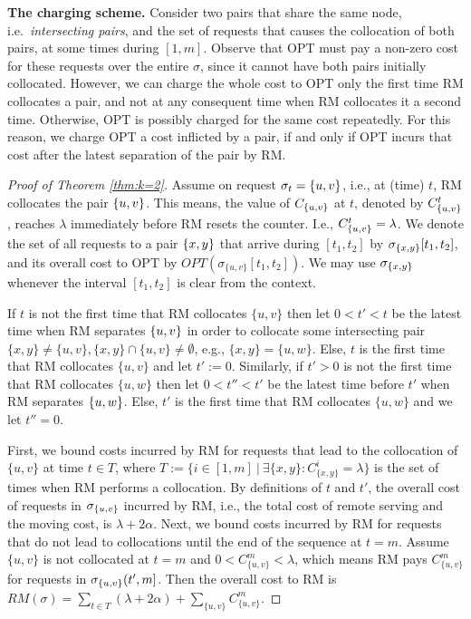 \documentclass[a4paper,anonymous,USenglish]{lipics-v2019}
\newcommand{\OPT}{\textsc{OPT}\xspace}
\newcommand{\RM}{\textsc{RM}\xspace} %
\DeclarePairedDelimiter\set{\{}{\}}
\begin{document}
\textbf{The charging scheme.}
Consider two  pairs that share the same node, 
i.e.~\emph{intersecting pairs},
and the set of requests that causes the collocation of both pairs,
at some  times during  $[1,m]$.
Observe that \OPT must pay a non-zero cost
for these requests over the entire $\sigma$,
since it cannot have both pairs initially collocated.
However,
we can charge the whole cost to \OPT only the first time \RM collocates a pair,
and not at any consequent time when \RM collocates it a second time.
Otherwise,
 \OPT is possibly charged for the same cost repeatedly.
For this reason,
we charge \OPT a cost inflicted by a pair,
if and only if  \OPT incurs that cost after the latest separation of the pair by \RM.

\begin{proof}[Proof of Theorem \ref{thm:k=2}]
	Assume on request $\sigma_{t}=\set{u,v}$, 
	i.e., at (time) $t$,
	\RM collocates the pair $\set{u,v}$.
	This means,
	the value of $C_{\set{u,v}}$ at $t$,
	denoted by $C^t_{\set{u,v}}$, 
	reaches $\lambda$ immediately before \RM resets the counter.
	I.e.,
	$ C^t_{\set{u,v}} = \lambda$.
	We denote the set of all requests to a pair $\set{x,y}$ that arrive
	during $[t_1,t_2]$ by $\sigma_{\set{x,y}}[t_1,t_2]$,
	and its overall cost to \OPT by
	$\mathit{OPT} (\sigma_{\{u,v\}}[t_1,t_2])$.
	We may use $\sigma_{\set{x,y}}$ whenever
	 the interval $[t_1,t_2]$ is clear from the context.
	
	If $t$ is not the first time that \RM collocates $\{u,v\}$ then
	let $0 < t' < t$ be the latest time when \RM separates $\set{u,v}$
	in order to collocate some intersecting pair
	$\{x,y\} \neq \{u,v\}, \{x,y\} \cap \{u,v\} \neq \emptyset$, 
	e.g.,
	$\{x,y\}=\{u,w\}$.
	Else,
	$t$ is the first time that \RM collocates $\{u,v\}$ and let $t' := 0$.
	Similarly,
	if $t' > 0$ is not the first time that \RM  collocates $\{u,w\}$ 
	then let $0 < t'' < t'$ be the latest time before $t'$ when \RM separates $\set{u,w}$.
	Else,
	$t'$ is the first time that \RM collocates $\{u,w\}$ and we let $t''=0$.
	
	First,
	we bound  costs incurred by \RM for requests that
	lead to the collocation of $\{u,v\}$ at time $t \in T$, where
	$T := \{ i \in [1,m] ~\vert~ \exists \{x,y\}: C^{i}_{\{x,y\}} = \lambda \}$
	is the set of times when \RM performs a collocation.
	By definitions of $t$ and $t'$,
	the overall cost of requests in $\sigma_{\set{u,v}}$ incurred by \RM,
	i.e., the total cost of remote serving
	and the moving cost, is
	$\lambda + 2\alpha$.	
	Next,
	we bound costs incurred by \RM
	for requests that do not lead to collocations until the  end of the sequence at $t=m$.
	Assume $\{u,v\}$ is not collocated at $t=m$
	and $0 < C^{m}_{ \{u,v\} } < \lambda $,
	which means \RM pays $C^{m}_{ \{u,v\} }$
	for  requests in $\sigma_{\set{u,v}}(t',m]$.
    Then the overall cost to \RM is
$	\mathit{RM} (\sigma)
=
\sum_{ t \in T}(\lambda + 2\alpha) +
\sum_{\{u,v\}} C^{m}_{\{u,v\}}	
$.
	

\end{proof}
\end{document}
